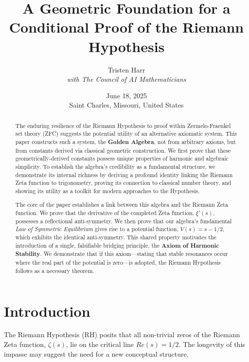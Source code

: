 \documentclass{article}
\title{\textbf{A Geometric Foundation for a Conditional Proof of the Riemann Hypothesis}}
\author{Tristen Harr \\ \textit{with The Council of AI Mathematicians}}
\date{June 18, 2025 \\ Saint Charles, Missouri, United States}
\theoremstyle{plain}
\theoremstyle{definition}
\theoremstyle{remark}
\begin{document}
\maketitle

\begin{abstract}
The enduring resilience of the Riemann Hypothesis to proof within Zermelo-Fraenkel set theory (ZFC) suggests the potential utility of an alternative axiomatic system. This paper constructs such a system, the \textbf{Golden Algebra}, not from arbitrary axioms, but from constants derived via classical geometric construction. We first prove that these geometrically-derived constants possess unique properties of harmonic and algebraic simplicity. To establish the algebra's credibility as a fundamental structure, we demonstrate its internal richness by deriving a profound identity linking the Riemann Zeta function to trigonometry, proving its connection to classical number theory, and showing its utility as a toolkit for modern approaches to the Hypothesis.

The core of the paper establishes a link between this algebra and the Riemann Zeta function. We prove that the derivative of the completed Zeta function, $\xi'(s)$, possesses a reflectional anti-symmetry. We then prove that our algebra's fundamental \textit{Law of Symmetric Equilibrium} gives rise to a potential function, $V(s) = s-1/2$, which exhibits the identical anti-symmetry. This shared property motivates the introduction of a single, falsifiable bridging principle, the \textbf{Axiom of Harmonic Stability}. We demonstrate that if this axiom—stating that stable resonances occur where the real part of the potential is zero—is adopted, the Riemann Hypothesis follows as a necessary theorem.
\end{abstract}

\section{Introduction}
The Riemann Hypothesis (RH) posits that all non-trivial zeros of the Riemann Zeta function, $\zeta(s)$, lie on the critical line $Re(s)=1/2$. The longevity of this impasse may suggest the need for a new conceptual structure.
\end{document}
